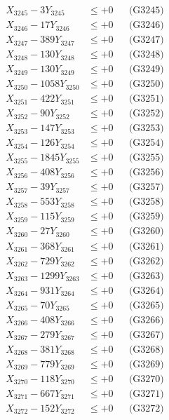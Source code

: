 \documentclass[a4paper,10pt]{article}
\begin{document}
{\begin{align}
X_{3245} - 3Y_{3245} &\leq +0 && \text{(G3245)} \\
X_{3246} - 17Y_{3246} &\leq +0 && \text{(G3246)} \\
X_{3247} - 389Y_{3247} &\leq +0 && \text{(G3247)} \\
X_{3248} - 130Y_{3248} &\leq +0 && \text{(G3248)} \\
X_{3249} - 130Y_{3249} &\leq +0 && \text{(G3249)} \\
X_{3250} - 1058Y_{3250} &\leq +0 && \text{(G3250)} \\
\allowbreak
X_{3251} - 422Y_{3251} &\leq +0 && \text{(G3251)} \\
X_{3252} - 90Y_{3252} &\leq +0 && \text{(G3252)} \\
X_{3253} - 147Y_{3253} &\leq +0 && \text{(G3253)} \\
X_{3254} - 126Y_{3254} &\leq +0 && \text{(G3254)} \\
X_{3255} - 1845Y_{3255} &\leq +0 && \text{(G3255)} \\
X_{3256} - 408Y_{3256} &\leq +0 && \text{(G3256)} \\
X_{3257} - 39Y_{3257} &\leq +0 && \text{(G3257)} \\
X_{3258} - 553Y_{3258} &\leq +0 && \text{(G3258)} \\
X_{3259} - 115Y_{3259} &\leq +0 && \text{(G3259)} \\
X_{3260} - 27Y_{3260} &\leq +0 && \text{(G3260)} \\
\allowbreak
X_{3261} - 368Y_{3261} &\leq +0 && \text{(G3261)} \\
X_{3262} - 729Y_{3262} &\leq +0 && \text{(G3262)} \\
X_{3263} - 1299Y_{3263} &\leq +0 && \text{(G3263)} \\
X_{3264} - 931Y_{3264} &\leq +0 && \text{(G3264)} \\
X_{3265} - 70Y_{3265} &\leq +0 && \text{(G3265)} \\
X_{3266} - 408Y_{3266} &\leq +0 && \text{(G3266)} \\
X_{3267} - 279Y_{3267} &\leq +0 && \text{(G3267)} \\
X_{3268} - 381Y_{3268} &\leq +0 && \text{(G3268)} \\
X_{3269} - 779Y_{3269} &\leq +0 && \text{(G3269)} \\
X_{3270} - 118Y_{3270} &\leq +0 && \text{(G3270)} \\
\allowbreak
X_{3271} - 667Y_{3271} &\leq +0 && \text{(G3271)} \\
X_{3272} - 152Y_{3272} &\leq +0 && \text{(G3272)} \\

\end{align}}
\end{document}
